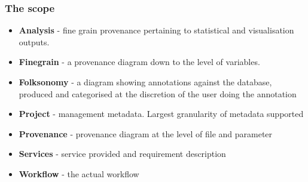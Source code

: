 \documentclass[usenames,dvipsnames,10pt]{beamer}
\begin{document}
\begin{frame}
    \frametitle{The scope}
    \begin{itemize} 
        \item \textbf{Analysis} - fine grain provenance pertaining to statistical and visualisation outputs.
        \item \textbf{Finegrain} - a provenance diagram down to the level of variables.  
        \item \textbf{Folksonomy} - a diagram showing annotations against the database, produced and categorised at the discretion of the user doing the annotation 
        \item \textbf{Project} - management metadata. Largest granularity of metadata supported 
        \item \textbf{Provenance} - provenance diagram at the level of file and parameter 
        \item \textbf{Services} - service provided and requirement description 
        \item \textbf{Workflow} - the actual workflow
    \end{itemize}
\end{frame}
\end{document}
